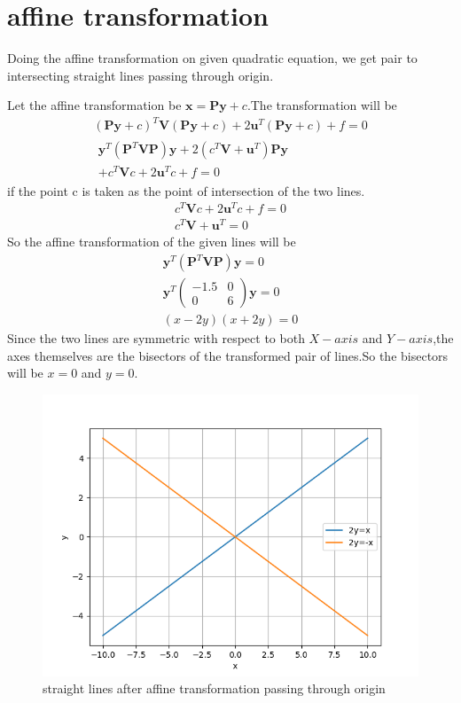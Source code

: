 \documentclass[journal,12pt,twocolumn]{IEEEtran}
\providecommand{\brak}[1]{\ensuremath{\left(#1\right)}}
\newcommand{\myvec}[1]{\ensuremath{\begin{pmatrix}#1\end{pmatrix}}}
\numberwithin{equation}{subsection}
\let\vec\mathbf
\begin{document}
\section{affine transformation}
Doing the affine transformation on given quadratic equation, we get pair to intersecting straight lines passing through origin.\par
Let the affine transformation be $\vec{x}=\vec{P}\vec{y}+c$.The transformation will be
\begin{align}
    \brak{\vec{P}\vec{y}+c}^T\vec{V}\brak{\vec{P}\vec{y}+c}+2\vec{u}^T\brak{\vec{P}\vec{y}+c}+f=0\\
    \begin{multlined}
        \vec{y}^T\brak{\vec{P}^T\vec{V}\vec{P}}\vec{y}+2\brak{c^T\vec{V}+\vec{u}^T}\vec{P}\vec{y}\\
        +c^T\vec{V}c+2\vec{u}^Tc+f=0
    \end{multlined}\label{eq:5}
\end{align}
if the point c is taken as the point of intersection of the two lines.
\begin{align}
    c^T\vec{V}c+2\vec{u}^Tc+f=0\\
    c^T\vec{V}+\vec{u}^T=0
\end{align}
So the affine transformation of the given lines will be
\begin{align}
    \vec{y}^T\brak{\vec{P}^T\vec{V}\vec{P}}\vec{y}=0\\
    \vec{y}^T\myvec{-1.5&0\\0&6}\vec{y}=0\\
    \brak{x-2y}\brak{x+2y}=0
\end{align}
Since the two lines are symmetric with respect to both $X-axis$ and $Y-axis$,the axes themselves are the bisectors of the transformed pair of lines.So the bisectors will be $x=0$ and $y=0$.
\begin{figure}[h]
    \centering
    \includegraphics[width=\columnwidth]{Fig1_a5.png}
    \caption{straight lines after affine transformation passing through origin}
    \label{fig:1}
\end{figure}
\end{document}
